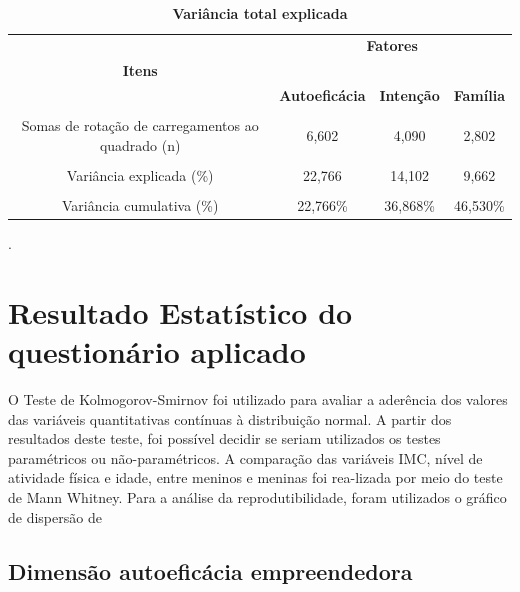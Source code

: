 \begin{table}[H]
 \label{tabela_4}
 \centering
\caption{\textbf{Variância total explicada}}
 \\ \hline\hline
\begin{tabular}{c c c c }
\multicolumn{1}{p{6cm}}{} & \multicolumn{3}{c}{\textbf{Fatores}}\\ 
 \multicolumn{1}{c}{\textbf{Itens}} & \multicolumn{3}{c}{\hrulefill}\\ 

 \multicolumn{1}{c}{} 
 &\multicolumn{1}{c}{\textbf{Autoeficácia}} & \multicolumn{1}{c}{\textbf{Intenção}} &\multicolumn{1}{c}{\textbf{Família}}  
\\\\ \hline 

 Somas de rotação de carregamentos ao quadrado (n)
 & 6,602 & 4,090 & 2,802 \\\\
 Variância explicada (\%)
 & 22,766 & 14,102 & 9,662\\\\
 Variância cumulativa (\%)
 & 22,766\% & 36,868\% & 46,530\% \\\hline \hline 
 
\end{tabular}
.
\end{table}





\section{Resultado Estatístico do questionário aplicado}
O Teste de Kolmogorov-Smirnov foi utilizado para avaliar a aderência dos valores das variáveis quantitativas contínuas à  distribuição  normal.  A  partir  dos  resultados  deste  teste,  foi  possível  decidir  se  seriam  utilizados  os  testes  paramétricos  ou  não-paramétricos.  A  comparação  das  variáveis  IMC,  nível  de  atividade  física  e  idade,  entre  meninos  e  meninas  foi  rea-lizada  por  meio  do  teste  de  Mann  Whitney.  Para  a  análise  da  reprodutibilidade, foram utilizados o gráfico de dispersão de 



\subsection{Dimensão autoeficácia empreendedora}

